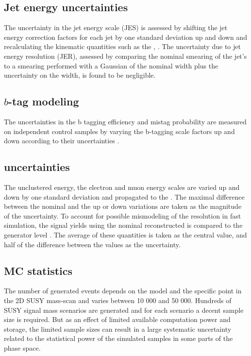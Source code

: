 \subsection*{Jet energy uncertainties}
\noindent\justify
The uncertainty in the jet energy scale (JES) is assessed by shifting the jet energy correction factors for each jet by one standard deviation up and down and recalculating the kinematic quantities such as the \ptmiss, \mttwo. 
The uncertainty due to jet energy resolution (JER), assessed by comparing the nominal smearing of the jet's \pt to a smearing performed with a Gaussian of the nominal width plus the uncertainty on the width, is found to be negligible.  
\subsection*{$b$-tag modeling} 
\noindent\justify
The uncertainties in the b tagging efficiency and mistag probability are measured on independent control samples by varying the b-tagging scale factors up and down according to their uncertainties \cite{Sirunyan:2017ezt}. 
\subsection*{\ptmiss uncertainties} 
\noindent\justify
The unclustered energy, the electron and muon energy scales are varied up and down by one standard deviation and propagated to the \ptmiss. 
The maximal difference between the nominal \ptmiss and the up or down variations are taken as the magnitude of the uncertainty. 
To account for possible mismodeling of the \ptmiss resolution in fast simulation, the signal yields using the nominal reconstructed \ptmiss is compared to the generator level \ptmiss. 
The average of these \ptmiss quantities is taken as the central value, and half of the difference between the values as the uncertainty. 
\subsection*{MC statistics} 
\noindent\justify
The number of generated events depends on the model and the specific point in the 2D SUSY mass-scan and varies between 10 000 and 50 000.
Hundreds of SUSY signal mass scenarios are generated and for each scenario a decent sample size is required. 
But as an effect of limited available computation power and storage, the limited sample sizes can result in a large systematic uncertainty related to the statistical power of the simulated samples in some parts of the phase space. 
